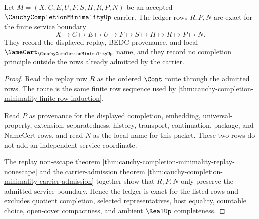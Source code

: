 \begin{theorem}
\label{thm:cauchy-completion-minimality-ledger-exactness}
Let $M=(X,C,E,U,F,S,H,R,P,N)$ be an accepted $\CauchyCompletionMinimalityUp$ carrier. The ledger rows $R,P,N$ are exact for the finite service boundary
$$
X\longmapsto C\longmapsto E\longmapsto U\longmapsto F\longmapsto S\longmapsto H\longmapsto R\longmapsto P\longmapsto N .
$$
They record the displayed replay, BEDC provenance, and local $\NameCert_{\CauchyCompletionMinimalityUp}$ name, and they record no completion principle outside the rows already admitted by the carrier.
\end{theorem}
\begin{proof}
Read the replay row $R$ as the ordered $\Cont$ route through the admitted rows. The route is the same finite row sequence used by \autoref{thm:cauchy-completion-minimality-finite-row-induction}.

Read $P$ as provenance for the displayed completion, embedding, universal-property, extension, separatedness, history, transport, continuation, package, and NameCert rows, and read $N$ as the local name for this packet. These two rows do not add an independent service coordinate.

The replay non-escape theorem \autoref{thm:cauchy-completion-minimality-replay-nonescape} and the carrier-admission theorem \autoref{thm:cauchy-completion-minimality-carrier-admission} together show that $R,P,N$ only preserve the admitted service boundary. Hence the ledger is exact for the listed rows and excludes quotient completion, selected representatives, host equality, countable choice, open-cover compactness, and ambient $\RealUp$ completeness.
\end{proof}

